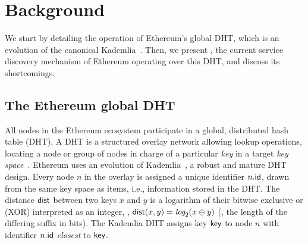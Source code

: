

\section{Background}
\label{sec:background}

We start by detailing the operation of Ethereum's global DHT, which is an evolution of the canonical Kademlia~\cite{maymounkov2002kademlia}.
Then, we present \discv, the current service discovery mechanism of Ethereum operating over this DHT, and discuss its shortcomings.

\subsection{The Ethereum global DHT}
\label{sec:background:dht}

All nodes in the Ethereum ecosystem participate in a global, distributed hash table (DHT).
A DHT is a structured overlay network allowing lookup operations, \ie locating a node or group of nodes in charge of a particular \emph{key} in a target \emph{key space}~\cite{chord,rowstron2001pastry}. 
Ethereum uses an evolution of Kademlia~\cite{maymounkov2002kademlia}, a robust and mature DHT design. %
Every node $n$ in the overlay is assigned a unique identifier $n.\mathsf{id}$, drawn from the same key space as items, i.e., information stored in the DHT.
The distance $\mathsf{dist}$ between two keys $x$ and $y$ is a logarithm of their bitwise exclusive or (XOR) interpreted as an integer, \ie, $\mathsf{dist}(x,y) = \textit{log}_2(x \oplus y)$ (\ie, the length of the differing suffix in bits).
The Kademlia DHT assigns key $\mathsf{key}$ to node $n$ with identifier $n.\mathsf{id}$ \emph{closest} to $\mathsf{key}$. 

